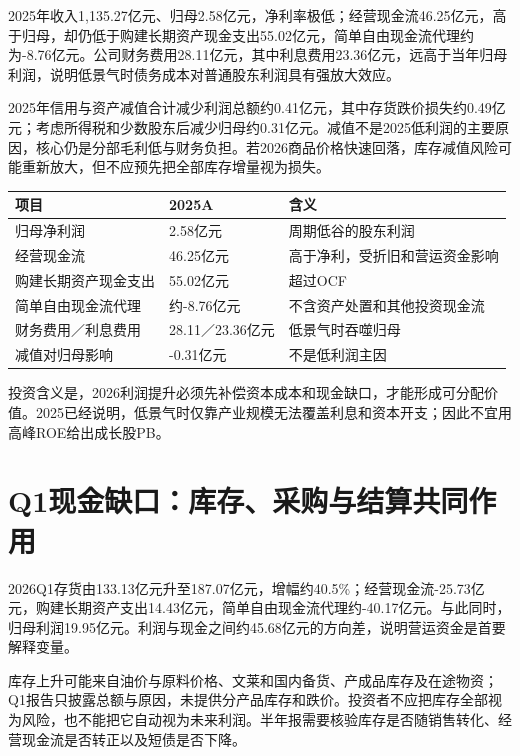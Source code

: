 2025年收入1,135.27亿元、归母2.58亿元，净利率极低；经营现金流46.25亿元，高于归母，却仍低于购建长期资产现金支出55.02亿元，简单自由现金流代理约为-8.76亿元。公司财务费用28.11亿元，其中利息费用23.36亿元，远高于当年归母利润，说明低景气时债务成本对普通股东利润具有强放大效应。

2025年信用与资产减值合计减少利润总额约0.41亿元，其中存货跌价损失约0.49亿元；考虑所得税和少数股东后减少归母约0.31亿元。减值不是2025低利润的主要原因，核心仍是分部毛利低与财务负担。若2026商品价格快速回落，库存减值风险可能重新放大，但不应预先把全部库存增量视为损失。

\begin{exhibitbox}[2025利润到现金与资本回报]
\noindent\begin{tabularx}{\textwidth}{L{4.1cm}R{2.2cm}X}
\toprule
\textbf{项目} & \textbf{2025A} & \textbf{含义} \\
\midrule
归母净利润 & 2.58亿元 & 周期低谷的股东利润 \\
经营现金流 & 46.25亿元 & 高于净利，受折旧和营运资金影响 \\
购建长期资产现金支出 & 55.02亿元 & 超过OCF \\
简单自由现金流代理 & 约-8.76亿元 & 不含资产处置和其他投资现金流 \\
财务费用／利息费用 & 28.11／23.36亿元 & 低景气时吞噬归母 \\
减值对归母影响 & -0.31亿元 & 不是低利润主因 \\
\bottomrule
\end{tabularx}
\end{exhibitbox}

投资含义是，2026利润提升必须先补偿资本成本和现金缺口，才能形成可分配价值。2025已经说明，低景气时仅靠产业规模无法覆盖利息和资本开支；因此不宜用高峰ROE给出成长股PB。

\section{Q1现金缺口：库存、采购与结算共同作用}

2026Q1存货由133.13亿元升至187.07亿元，增幅约40.5\%；经营现金流-25.73亿元，购建长期资产支出14.43亿元，简单自由现金流代理约-40.17亿元。与此同时，归母利润19.95亿元。利润与现金之间约45.68亿元的方向差，说明营运资金是首要解释变量。

库存上升可能来自油价与原料价格、文莱和国内备货、产成品库存及在途物资；Q1报告只披露总额与原因，未提供分产品库存和跌价。投资者不应把库存全部视为风险，也不能把它自动视为未来利润。半年报需要核验库存是否随销售转化、经营现金流是否转正以及短债是否下降。

